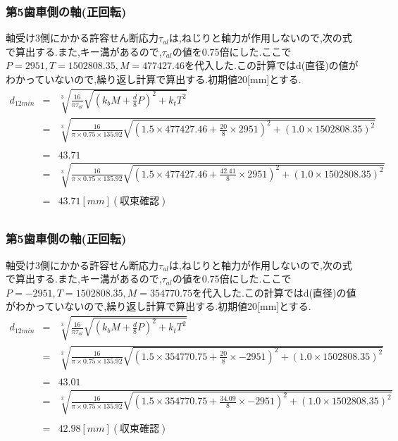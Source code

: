 \subsubsection{第5歯車側の軸(正回転)}
軸受け3側にかかる許容せん断応力$\tau_{al}$は,ねじりと軸力が作用しないので,次の式で算出する.また,キー溝があるので,$\tau_{al}$の値を0.75倍にした.ここで$P=2951,T=1502808.35, M=477427.46$を代入した.この計算ではd(直径)の値がわかっていないので,繰り返し計算で算出する.初期値20[mm]とする.
\begin{eqnarray}
d_{12min}&=& \sqrt [3]{ \frac{16}{\pi \tau_{al}}\sqrt{(k_bM+\frac{d}{8}P)^2+k_tT^2} }\\
       &=& \sqrt [3]{ \frac{16}{\pi \times 0.75 \times 135.92} \sqrt{(1.5 \times 477427.46 +\frac{20}{8}\times 2951)^2+(1.0 \times 1502808.35)^2} }\nonumber\\
\\
       &=&43.71\\
       &=& \sqrt [3]{ \frac{16}{\pi \times 0.75 \times 135.92} \sqrt{(1.5 \times 477427.46 +\frac{42.41}{8}\times 2951)^2+(1.0 \times 1502808.35)^2} }\nonumber\\
\\
       &=& 43.71[mm](収束確認)\\
\end{eqnarray}
\subsubsection{第5歯車側の軸(正回転)}
軸受け3側にかかる許容せん断応力$\tau_{al}$は,ねじりと軸力が作用しないので,次の式で算出する.また,キー溝があるので,$\tau_{al}$の値を0.75倍にした.ここで$P=-2951,T=1502808.35,M=354770.75$を代入した.この計算ではd(直径)の値がわかっていないので,繰り返し計算で算出する.初期値20[mm]とする.
\begin{eqnarray}
d_{12min}&=& \sqrt [3]{ \frac{16}{\pi \tau_{al}}\sqrt{(k_bM+\frac{d}{8}P)^2+k_tT^2} }\\
       &=& \sqrt [3]{ \frac{16}{\pi \times 0.75 \times 135.92} \sqrt{(1.5 \times 354770.75 +\frac{20}{8}\times -2951)^2+(1.0 \times 1502808.35)^2} }\nonumber\\
\\
       &=& 43.01\\
       &=& \sqrt [3]{ \frac{16}{\pi \times 0.75 \times 135.92} \sqrt{(1.5 \times 354770.75 +\frac{34.09}{8}\times -2951)^2+(1.0 \times 1502808.35)^2} }\nonumber\\
\\
         &=& 42.98[mm](収束確認)
\end{eqnarray}

